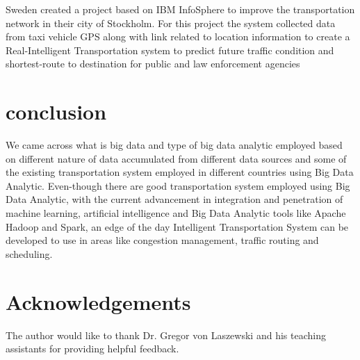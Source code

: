 \documentclass[sigconf]{acmart}
\begin{document}
Sweden created a project based on IBM InfoSphere \cite{bdlt} to improve the transportation network in their city of Stockholm. For this project the system collected data from taxi vehicle GPS along with link related to location information to create a Real-Intelligent Transportation system to predict future traffic condition and shortest-route to destination for public and law enforcement agencies


\section{conclusion}

We came across what is big data and type of big data analytic employed based on different nature of data accumulated from different data sources and some of the existing transportation system employed in different countries using Big Data Analytic. Even-though there are good transportation system employed using Big Data Analytic, with the current advancement in integration and penetration of machine learning, artificial intelligence and Big Data Analytic tools like Apache Hadoop and Spark, an edge of the day Intelligent Transportation System can be developed to use in areas like congestion management, traffic routing and scheduling.

\section*{Acknowledgements}

The author would like to thank Dr. Gregor von Laszewski and his teaching assistants for providing helpful feedback.




\end{document}
